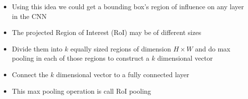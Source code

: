 \begin{frame}
\begin{columns}
\begin{overlayarea}{\textwidth}{\textheight}
			\begin{itemize}
				\justifying
				\item<1-> Using this idea we could get a bounding box's region of influence on any layer in the CNN 
				\item<2-> The projected Region of Interest (RoI) may be of different sizes
				\item<3-> Divide them into $k$ equally sized regions of dimension $H \times W$ and do max pooling in each of those regions to construct a $k$ dimensional vector 
				\item<4-> Connect the $k$ dimensional vector to a fully connected layer
				\item<5-> This max pooling operation is call RoI pooling 
			\end{itemize}
		\end{overlayarea}
	\end{columns}              
	
\end{frame}


